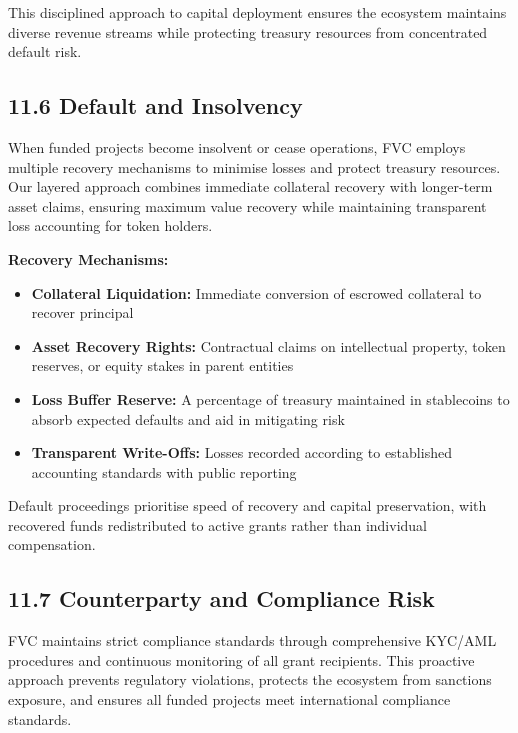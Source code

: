 \documentclass[
  paper=a4,
  ,captions=tableheading
]{scrartcl}
\providecommand{\tightlist}{%
  \setlength{\itemsep}{0pt}\setlength{\parskip}{0pt}}
\begin{document}
This disciplined approach to capital deployment ensures the ecosystem
maintains diverse revenue streams while protecting treasury resources
from concentrated default risk.

\subsection{11.6 Default and Insolvency}\label{default-and-insolvency}

When funded projects become insolvent or cease operations, FVC employs
multiple recovery mechanisms to minimise losses and protect treasury
resources. Our layered approach combines immediate collateral recovery
with longer-term asset claims, ensuring maximum value recovery while
maintaining transparent loss accounting for token holders.

\textbf{Recovery Mechanisms:}

\begin{itemize}
\tightlist
\item
  \textbf{Collateral Liquidation:} Immediate conversion of escrowed
  collateral to recover principal
\item
  \textbf{Asset Recovery Rights:} Contractual claims on intellectual
  property, token reserves, or equity stakes in parent entities
\item
  \textbf{Loss Buffer Reserve:} A percentage of treasury maintained in
  stablecoins to absorb expected defaults and aid in mitigating risk
\item
  \textbf{Transparent Write-Offs:} Losses recorded according to
  established accounting standards with public reporting
\end{itemize}

Default proceedings prioritise speed of recovery and capital
preservation, with recovered funds redistributed to active grants rather
than individual compensation.

\subsection{11.7 Counterparty and Compliance
Risk}\label{counterparty-and-compliance-risk}

FVC maintains strict compliance standards through comprehensive
KYC/AML procedures and continuous monitoring of all grant recipients.
This proactive approach prevents regulatory violations, protects the
ecosystem from sanctions exposure, and ensures all funded projects meet
international compliance standards.
\end{document}

